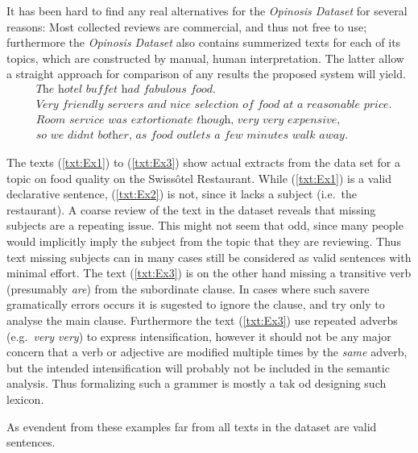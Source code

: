 It has been hard to find any real alternatives for the \emph{Opinosis Dataset} for several reasons: Most collected reviews are commercial, and thus not free to use; furthermore the \emph{Opinosis Dataset} also contains summerized texts for each of its topics, which are constructed by manual, human interpretation. The latter allow a straight approach for comparison of any results the proposed system will yield.\\
\begin{align}
  &\textit{The hotel buffet had fabulous food.}
  \label{txt:Ex1} \\[3mm]  
  &\textit{Very friendly servers and nice selection of food at a reasonable price.}
  \label{txt:Ex2} \\[3mm]  
  &\textit{Room service was extortionate though, very very expensive,} \nonumber \\
  &\textit{so we didnt bother, as food outlets a few minutes walk away.}
  \label{txt:Ex3}
\end{align}

The texts (\ref{txt:Ex1}) to (\ref{txt:Ex3}) show actual extracts from the data set for a topic on food quality on the Swissôtel Restaurant. While (\ref{txt:Ex1}) is a valid declarative sentence, (\ref{txt:Ex2}) is not, since it lacks a subject (i.e.\ the restaurant). A coarse review of the text in the dataset reveals that missing subjects are a repeating issue. This might not seem that odd, since many people would implicitly imply the subject from the topic that they are reviewing. Thus text missing subjects can in many cases still be considered as valid sentences with minimal effort. The text (\ref{txt:Ex3}) is on the other hand missing a transitive verb (presumably \emph{are}) from the subordinate clause. In cases where such savere gramatically errors occurs it is sugested to ignore the clause, and try only to analyse the main clause. Furthermore the text (\ref{txt:Ex3}) use repeated adverbs (e.g.\ \emph{very very}) to express intensification, however it should not be any major concern that a verb or adjective are modified multiple times by the \emph{same} adverb, but the intended intensification will probably not be included in the semantic analysis. Thus formalizing such a grammer is mostly a tak od designing such lexicon.

As evendent from these examples far from all texts in the dataset are valid sentences.

